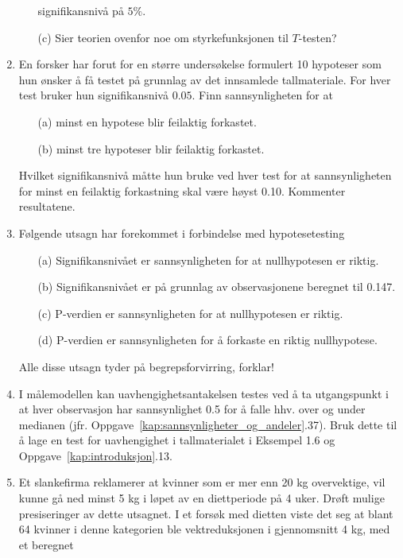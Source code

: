 \begin{enumerate}
\begin{itemize}
               signifikansnivå på $5\%$.
  \item[(c)]  Sier teorien ovenfor noe om styrkefunksjonen til $T$-testen?
 \end{itemize}
\item     En forsker har forut for en større
          undersøkelse formulert 10 hypoteser som hun
          ønsker å få testet på grunnlag av det
          innsamlede tallmateriale. For hver test bruker hun
          signifikansnivå $0.05$. Finn sannsynligheten for at
 \begin{itemize}
  \item[(a)]  minst en hypotese blir feilaktig forkastet.
  \item[(b)]  minst tre hypoteser blir feilaktig forkastet.
 \end{itemize}
          Hvilket signifikansnivå måtte hun bruke ved
          hver test for at sannsynligheten for minst en feilaktig
          forkastning skal være høyst 0.10. Kommenter
          resultatene.
\item     Følgende utsagn har forekommet i forbindelse med
          hypotesetesting
 \begin{itemize}
  \item[(a)]  Signifikansnivået er sannsynligheten for at
               nullhypotesen er riktig.
  \item[(b)]  Signifikansnivået er på grunnlag av
               observasjonene beregnet til 0.147.
  \item[(c)]  P-verdien er sannsynligheten for at nullhypotesen er riktig.
  \item[(d)]  P-verdien er sannsynligheten for å forkaste en riktig
               nullhypotese.
 \end{itemize}
          Alle disse utsagn tyder på begrepsforvirring,
          forklar!
\item I målemodellen kan uavhengighetsantakelsen testes ved å ta
      utgangspunkt i at hver observasjon har sannsynlighet 0.5 for å
      falle hhv. over og under medianen (jfr. Oppgave~\ref*{kap:sannsynligheter_og_andeler}.37).
      Bruk dette til å lage en test for uavhengighet i tallmaterialet i
      Eksempel 1.6  og Oppgave~\ref*{kap:introduksjon}.13.
\item Et slankefirma reklamerer at kvinner som er mer enn 20 kg overvektige,
      vil kunne gå ned minst 5 kg i løpet av en diettperiode på
      4 uker. Drøft mulige presiseringer av dette utsagnet.
      I et forsøk med dietten viste det seg at blant 64 kvinner i denne 
      kategorien ble vektreduksjonen i gjennomsnitt 4 kg, med et beregnet

\end{enumerate}
